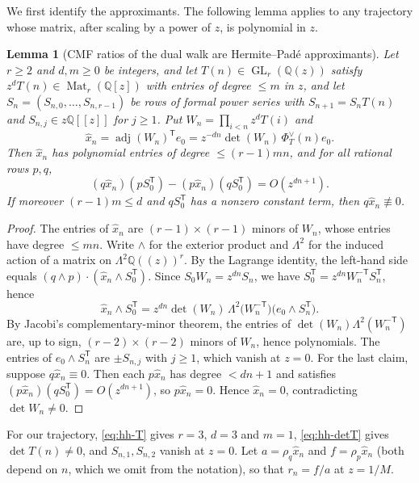 \documentclass[oneside,english,11pt]{amsart}
\newtheorem{lemma}[thm]{Lemma}
\begin{document}
We first identify the approximants. The following lemma applies to any trajectory whose matrix, after scaling by a power of $z$, is polynomial in $z$.

\begin{lemma}[CMF ratios of the dual walk are Hermite--Pad\'e approximants]\label{lem:dual-pade}
Let $r \geq 2$ and $d, m \geq 0$ be integers, and let $T(n)\in\operatorname{GL}_r(\mathbb Q(z))$ satisfy $z^dT(n)\in\operatorname{Mat}_r(\mathbb Q[z])$ with entries of degree $\le m$ in $z$, and let $S_n=(S_{n,0},\dots,S_{n,r-1})$ be rows of formal power series with $S_{n+1}=S_nT(n)$ and $S_{n,j}\in z\mathbb Q[[z]]$ for $j\ge1$. Put $W_n=\prod_{i<n}z^dT(i)$ and
\[
 \hat x_n=\operatorname{adj}(W_n)^{\mathsf T}e_0=z^{-dn}\det(W_n)\,\Phi_T^\vee(n)e_0.
\]
Then $\hat x_n$ has polynomial entries of degree $\le(r-1)mn$, and for all rational rows $p,q$,
\[
 (q\hat x_n)(pS_0^{\mathsf T})-(p\hat x_n)(qS_0^{\mathsf T})=O(z^{dn+1}).
\]
If moreover $(r-1)m\le d$ and $qS_0^{\mathsf T}$ has a nonzero constant term, then $q\hat x_n\not\equiv0$.
\end{lemma}
\begin{proof}
The entries of $\hat x_n$ are $(r-1)\times(r-1)$ minors of $W_n$, whose entries have degree $\le mn$.
Write $\wedge$ for the exterior product and $\Lambda^2$ for the induced action of a matrix on $\Lambda^2\mathbb Q((z))^r$. By the Lagrange identity, the left-hand side equals $(q\wedge p)\cdot(\hat x_n\wedge S_0^{\mathsf T})$.
Since $S_0W_n=z^{dn}S_n$, we have $S_0^{\mathsf T}=z^{dn}W_n^{-\mathsf T}S_n^{\mathsf T}$, hence
\[
 \hat x_n\wedge S_0^{\mathsf T}=z^{dn}\det(W_n)\,\Lambda^2\bigl(W_n^{-\mathsf T}\bigr)\bigl(e_0\wedge S_n^{\mathsf T}\bigr).
\]
By Jacobi's complementary-minor theorem, the entries of $\det(W_n)\Lambda^2(W_n^{-\mathsf T})$ are, up to sign, $(r-2)\times(r-2)$ minors of $W_n$, hence polynomials. The entries of $e_0\wedge S_n^{\mathsf T}$ are $\pm S_{n,j}$ with $j\ge1$, which vanish at $z=0$.
For the last claim, suppose $q\hat x_n\equiv0$. Then each $p\hat x_n$ has degree $<dn+1$ and satisfies $(p\hat x_n)(qS_0^{\mathsf T})=O(z^{dn+1})$, so $p\hat x_n=0$. Hence $\hat x_n=0$, contradicting $\det W_n\ne0$.
\end{proof}

For our trajectory, \eqref{eq:hh-T} gives $r=3$, $d=3$ and $m=1$, \eqref{eq:hh-detT} gives $\det T(n)\ne0$, and $S_{n,1},S_{n,2}$ vanish at $z=0$.
Let $a=\rho_q\hat x_n$ and $f=\rho_p\hat x_n$ (both depend on $n$, which we omit from the notation), so that $r_n=f/a$ at $z=1/M$.
\end{document}
